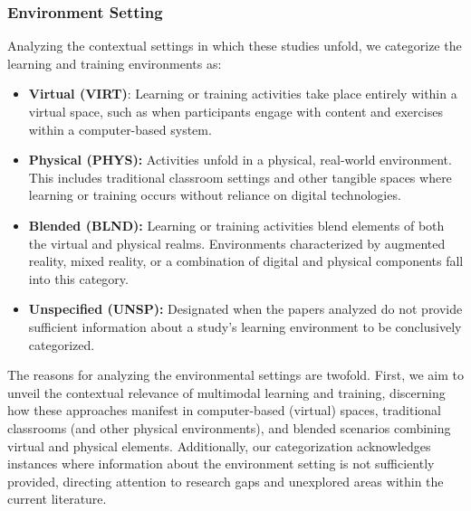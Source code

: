 \documentclass[manuscript,screen,review]{acmart}
\begin{document}
\subsubsection{Environment Setting} \label{subsec:environment_setting}

Analyzing the contextual settings in which these studies unfold, we categorize the learning and training environments as: %

\begin{itemize}
    \item \textbf{Virtual (VIRT)}: Learning or training activities take place entirely within a virtual space, such as when participants engage with content and exercises within a computer-based system.  
    \item \textbf{Physical (PHYS):} Activities unfold in a physical, real-world environment. This includes traditional classroom settings and other tangible spaces where learning or training occurs without reliance on digital technologies. 
    \item \textbf{Blended (BLND):} Learning or training activities blend elements of both the virtual and physical realms. Environments characterized by augmented reality, mixed reality, or a combination of digital and physical components fall into this category. 
    \item \textbf{Unspecified (UNSP):} Designated when the papers analyzed do not provide sufficient information about a study's learning environment to be conclusively categorized.    
\end{itemize}

The reasons for analyzing the environmental settings are twofold. First, we aim to unveil the contextual relevance of multimodal learning and training, discerning how these approaches manifest in computer-based (virtual) spaces, traditional classrooms (and other physical environments), and blended scenarios combining virtual and physical elements. Additionally, our categorization acknowledges instances where information about the environment setting is not sufficiently provided, directing attention to research gaps and unexplored areas within the current literature.
\end{document}
